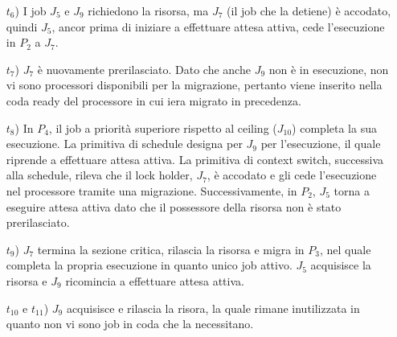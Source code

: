 \begin{itemize}
	\item [$t_6$)] I job $J_5$ e $J_9$ richiedono la risorsa, ma $J_7$ (il job che la detiene) è accodato, quindi $J_5$, ancor prima di iniziare a effettuare attesa attiva, cede l'esecuzione in $P_2$ a $J_7$.
	\item [$t_7$)] $J_7$ è nuovamente prerilasciato. Dato che anche $J_9$ non è in esecuzione, non vi sono processori disponibili per la migrazione, pertanto viene inserito nella coda ready del processore in cui iera migrato in precedenza.
	\item [$t_8$)] In $P_4$, il job a priorità superiore rispetto al ceiling ($J_{10}$) completa la sua esecuzione. La primitiva di schedule designa per $J_9$ per l'esecuzione, il quale riprende a effettuare attesa attiva. La primitiva di context switch, successiva alla schedule, rileva che il lock holder, $J_7$, è accodato e gli cede l'esecuzione nel processore tramite una migrazione. Successivamente, in $P_2$, $J_5$ torna a eseguire attesa attiva dato che il possessore della risorsa non è stato prerilasciato.
	\item [$t_9$)] $J_7$ termina la sezione critica, rilascia la risorsa e migra in $P_3$, nel quale completa la propria esecuzione in quanto unico job attivo. $J_5$ acquisisce la risorsa e $J_9$ ricomincia a effettuare attesa attiva.
	\item [$t_{10}$ e $t_{11}$)] $J_9$ acquisisce e rilascia la risora, la quale rimane inutilizzata in quanto non vi sono job in coda che la necessitano.
\end{itemize}
